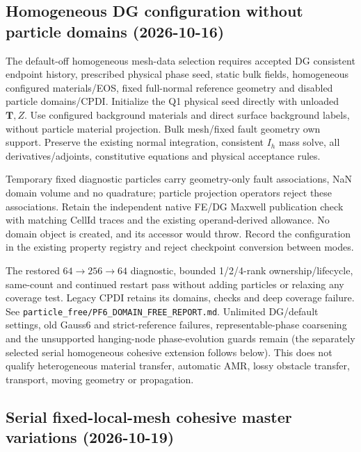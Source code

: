 \documentclass[11pt]{article}
\begin{document}
\subsection{Homogeneous DG configuration without particle domains (2026-10-16)}

The default-off homogeneous mesh-data selection requires accepted DG consistent
endpoint history, prescribed physical phase seed, static bulk fields, homogeneous
configured materials/EOS, fixed full-normal reference geometry and disabled
particle domains/CPDI. Initialize the Q1 physical seed directly with unloaded
$\bm T,Z$. Use configured background materials and direct surface background
labels, without particle material projection. Bulk mesh/fixed fault geometry own
support. Preserve the existing normal integration, consistent $I_h$ mass solve,
all derivatives/adjoints, constitutive equations and physical acceptance rules.

Temporary fixed diagnostic particles carry geometry-only fault associations,
NaN domain volume and no quadrature; particle projection operators reject these
associations. Retain the independent native FE/DG Maxwell publication check with
matching CellId traces and the existing operand-derived allowance. No domain
object is created, and its accessor would throw. Record the configuration in the
existing property registry and reject checkpoint conversion between modes.

The restored $64\to256\to64$ diagnostic, bounded 1/2/4-rank ownership/lifecycle,
same-count and continued restart pass without adding particles or relaxing any
coverage test. Legacy CPDI retains its domains, checks and deep coverage failure.
See \texttt{particle\_free/PF6\_DOMAIN\_FREE\_REPORT.md}. Unlimited DG/default
settings, old Gauss6 and strict-reference failures, representable-phase coarsening
and the unsupported hanging-node phase-evolution guards remain (the separately
selected serial homogeneous cohesive extension follows below). This does not qualify
heterogeneous material transfer, automatic AMR, lossy obstacle transfer, transport,
moving geometry or propagation.


\subsection{Serial fixed-local-mesh cohesive master variations (2026-10-19)}
\end{document}
